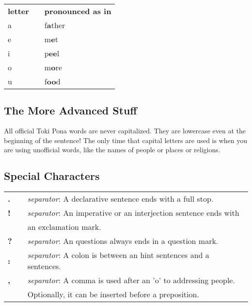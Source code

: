 \begin{supertabular}{p{2cm}|ll}
\textbf{letter}   &&    \textbf{pronounced as in} \\ %
a   &&    f\textbf{a}ther \\ %
e   &&    m\textbf{e}t    \\ %
i   &&    p\textbf{ee}l   \\ %
o   &&    m\textbf{o}re   \\ %
u   &&    f\textbf{oo}d   \\ %
\end{supertabular} 

%
\subsection*{The More Advanced Stuff}
%
All official Toki Pona words are never capitalized. 
They are lowercase even at the beginning of the sentence! 
The only time that capital letters are used is when you are using unofficial words, like the names of people or places or religions. 
%
%
\subsection*{Special Characters}
%

\begin{supertabular}{p{2cm}|ll} 
\textbf{.} && \textit{separator}: A declarative sentence ends with a full stop. \\ %
\textbf{!} && \textit{separator}: An imperative or an interjection sentence ends with \\ &&  an exclamation mark. \\ %
\textbf{?} && \textit{separator}: An questions always ends in a question mark. \\ %
\textbf{:} && \textit{separator}: A colon is between an hint sentences and a sentences. \\  %
\textbf{,} && \textit{separator}: A comma is used after an 'o' to addressing people. \\ && Optionally, it can be inserted before a preposition. \\ %
\end{supertabular} \\

